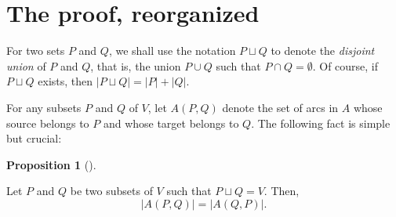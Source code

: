\documentclass[numbers=enddot,12pt,final,onecolumn,notitlepage]{scrartcl}%
\theoremstyle{definition}
\newtheorem{prop}[theo]{Proposition}
\newenvironment{proposition}[1][]
{\begin{prop}[#1]\begin{leftbar}}
{\end{leftbar}\end{prop}}
\theoremstyle{plainsl}
\begin{document}
\section{The proof, reorganized}

For two sets $P$ and $Q$, we shall use the notation $P \sqcup Q$ to denote the \textit{disjoint union} of $P$ and $Q$, that is, the union $P \cup Q$ such that $P \cap Q = \emptyset$. Of course, if $P \sqcup Q$ exists, then $|P \sqcup Q| =|P|+|Q|$.

For any subsets $P$ and $Q$ of $V$, let $A(P,Q)$ denote the set of arcs in $A$ whose source belongs to $P$ and whose target belongs to $Q$. The following fact is simple but crucial:

\begin{proposition}
\label{prop.A-symmetry}Let $P$ and $Q$ be two subsets of $V$ such that
$P\sqcup Q=V$. Then,
\[
\left\vert A\left(  P,Q\right)  \right\vert =\left\vert A\left(  Q,P\right)
\right\vert .
\]

\end{proposition}
\end{document}
